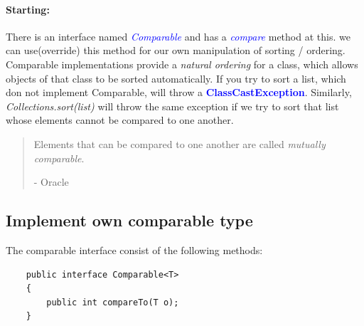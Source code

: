 \documentclass[10 pt]{book}
\begin{document}
\paragraph{Starting:}
\begin{multicols}{2}
There is an interface named \textit{\textcolor{blue}{Comparable}} and has a \textit{\textcolor{blue}{compare}} method at this. we can use(override) this method for our own manipulation of sorting / ordering. \textsf{Comparable} implementations provide a \textit{natural ordering} for a class, which allows objects of that class to be sorted automatically.\linebreak
If you try to sort a list, which don not implement Comparable, will throw a \textbf{\textcolor{blue}{ClassCastException}}. Similarly, \textit{Collections.sort(list)} will throw the same exception if we try to sort that list whose elements cannot be compared to one another.
\end{multicols}
\begin{quotation}
	Elements that can be compared to one another are called \textit{mutually comparable}.
	\begin{flushright}
		- Oracle
	\end{flushright}
\end{quotation}

\subsection{Implement own comparable type}
The comparable interface consist of the following methods:
\begin{lstlisting}
	public interface Comparable<T>
	{
		public int compareTo(T o);
	}
\end{lstlisting}
\end{document}
